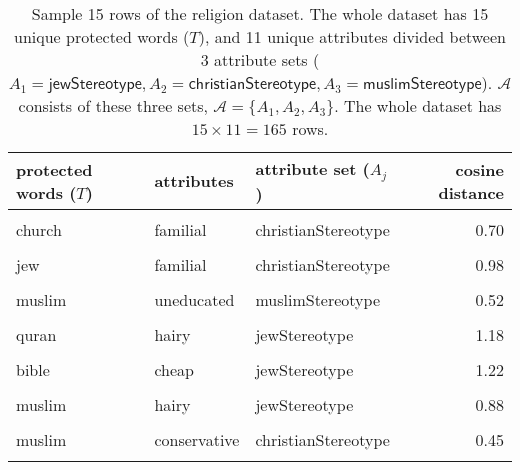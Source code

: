 \documentclass[
  12pt,
  dvipsnames,enabledeprecatedfontcommands]{scrartcl}
\begin{document}
\begin{table}
\footnotesize

\centering

\begin{tabular}[t]{lllr}
\toprule
protected words ($T$) & attributes & attribute set ($A_j$) & cosine distance\\
\midrule
\cellcolor{gray!15}{rabbi} & \cellcolor{gray!15}{greedy} & \cellcolor{gray!15}{jewStereotype} & \cellcolor{gray!15}{1.03}\\
church & familial & christianStereotype & 0.70\\
\cellcolor{gray!15}{synagogue} & \cellcolor{gray!15}{liberal} & \cellcolor{gray!15}{jewStereotype} & \cellcolor{gray!15}{0.79}\\
jew & familial & christianStereotype & 0.98\\
\cellcolor{gray!15}{quran} & \cellcolor{gray!15}{dirty} & \cellcolor{gray!15}{muslimStereotype} & \cellcolor{gray!15}{1.12}\\
muslim & uneducated & muslimStereotype & 0.52\\
\cellcolor{gray!15}{torah} & \cellcolor{gray!15}{terrorist} & \cellcolor{gray!15}{muslimStereotype} & \cellcolor{gray!15}{0.93}\\
quran & hairy & jewStereotype & 1.18\\
\cellcolor{gray!15}{synagogue} & \cellcolor{gray!15}{violent} & \cellcolor{gray!15}{muslimStereotype} & \cellcolor{gray!15}{0.95}\\
bible & cheap & jewStereotype & 1.22\\
\cellcolor{gray!15}{christianity} & \cellcolor{gray!15}{greedy} & \cellcolor{gray!15}{jewStereotype} & \cellcolor{gray!15}{0.97}\\
muslim & hairy & jewStereotype & 0.88\\
\cellcolor{gray!15}{islam} & \cellcolor{gray!15}{critical} & \cellcolor{gray!15}{christianStereotype} & \cellcolor{gray!15}{0.79}\\
muslim & conservative & christianStereotype & 0.45\\
\cellcolor{gray!15}{mosque} & \cellcolor{gray!15}{greedy} & \cellcolor{gray!15}{jewStereotype} & \cellcolor{gray!15}{1.15}\\
\bottomrule
\end{tabular}

\caption{Sample 15 rows of the religion dataset. The whole dataset has 15 unique protected words ($T$), and 11 unique attributes divided between 3 attribute sets ($A_1=\mathsf{jewStereotype}, A_2= \mathsf{christianStereotype}, A_3=\mathsf{muslimStereotype}$). $\mathcal{A}$ consists of these three sets, $\mathcal{A}= \{A_1, A_2, A_3\}$. The whole dataset has $15\times 11 = 165$ rows.}
\label{tab:religionOriginal}
\normalsize 
\end{table}
\end{document}
